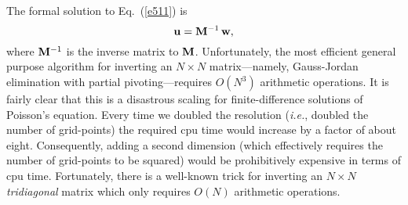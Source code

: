 The formal solution to Eq.~(\ref{e511}) is
\begin{equation}
{\bf u} = {\bf M}^{-1}\,{\bf w},
\end{equation}
where ${\bf M}^{-1}$ is the inverse matrix to ${\bf M}$. Unfortunately, the most efficient
general purpose algorithm for inverting an $N\times N$ matrix---namely, Gauss-Jordan elimination
with partial pivoting---requires $O(N^3)$ arithmetic operations. It is fairly clear that this
is a disastrous scaling for finite-difference solutions of Poisson's equation.
Every time we doubled the resolution ({\em i.e.}, doubled the number of grid-points) the
required cpu time would increase by a factor of about eight. Consequently, adding a second dimension (which
effectively requires the number of grid-points to be squared) would  be prohibitively expensive
in terms of cpu time. Fortunately, there is a well-known trick for inverting an $N\times N$ 
{\em tridiagonal}
matrix which only requires $O(N)$ arithmetic operations.

